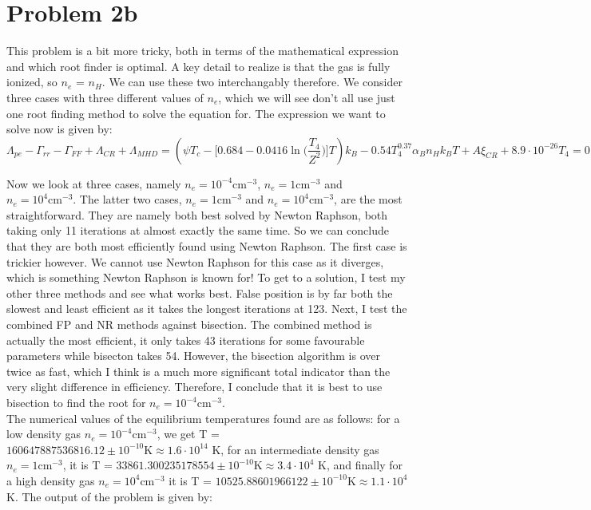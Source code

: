 \section*{Problem 2b}

This problem is a bit more tricky, both in terms of the mathematical expression and which root finder is optimal. A key detail to realize is that the gas is fully ionized, so $n_e$ = $n_H$. We can use these two interchangably therefore. We consider three cases with three different values of $n_e$, which we will see don't all use just one root finding method to solve the equation for. The expression we want to solve now is given by:\\

\begin{equation*}
	\Lambda_{pe} - \Gamma_{rr} -  \Gamma_{FF} + \Lambda_{CR} + \Lambda_{MHD} = (\psi T_c - \Bigg[0.684 - 0.0416 \ln \Big(\frac{T_4}{Z^2}\Big) \Bigg] T)k_B - 0.54 T_4^{0.37} \alpha_B n_H k_B T + A \xi_{CR} + 8.9 \cdot 10^{-26} T_4 = 0 
\end{equation*}

Now we look at three cases, namely $n_e = 10^{-4} \text{cm}^{-3}$, $n_e = 1 \text{cm}^{-3}$ and $n_e = 10^{4} \text{cm}^{-3}$. The latter two cases, $n_e = 1 \text{cm}^{-3}$ and $n_e = 10^{4} \text{cm}^{-3}$, are the most straightforward. They are namely both best solved by Newton Raphson, both taking only 11 iterations at almost exactly the same time. So we can conclude that they are both most efficiently found using Newton Raphson. The first case is trickier however. We cannot use Newton Raphson for this case as it diverges, which is something Newton Raphson is known for! To get to a solution, I test my other three methods and see what works best. False position is by far both the slowest and least efficient as it takes the longest iterations at 123. Next, I test the combined FP and NR methods against bisection. The combined method is actually the most efficient, it only takes 43 iterations for some favourable parameters while bisecton takes 54. However, the bisection algorithm is over twice as fast, which I think is a much more significant total indicator than the very slight difference in efficiency. Therefore, I conclude that it is best to use bisection to find the root for $n_e = 10^{-4} \text{cm}^{-3}$.\\

The numerical values of the equilibrium temperatures found are as follows: for a low density gas $n_e = 10^{-4} \text{cm}^{-3}$, we get T = $160647887536816.12 \pm 10^{-10} \text{K} \approx 1.6 \cdot 10^{14}$ K, for an intermediate density gas $n_e = 1 \text{cm}^{-3}$, it is T = $33861.300235178554 \pm 10^{-10} \text{K} \approx 3.4 \cdot 10^{4}$ K, and finally for a high density gas $n_e = 10^{4} \text{cm}^{-3}$ it is T = $10525.88601966122 \pm 10^{-10} \text{K} \approx 1.1 \cdot 10^{4}$ K. The output of the problem is given by:\\





